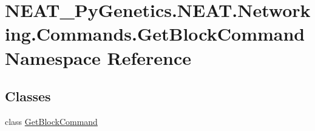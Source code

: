 \hypertarget{namespaceNEAT__PyGenetics_1_1NEAT_1_1Networking_1_1Commands_1_1GetBlockCommand}{}\section{N\+E\+A\+T\+\_\+\+Py\+Genetics.\+N\+E\+A\+T.\+Networking.\+Commands.\+Get\+Block\+Command Namespace Reference}
\label{namespaceNEAT__PyGenetics_1_1NEAT_1_1Networking_1_1Commands_1_1GetBlockCommand}
\subsection*{Classes}
\begin{DoxyCompactItemize}
\item 
class \hyperlink{classNEAT__PyGenetics_1_1NEAT_1_1Networking_1_1Commands_1_1GetBlockCommand_1_1GetBlockCommand}{Get\+Block\+Command}
\end{DoxyCompactItemize}
